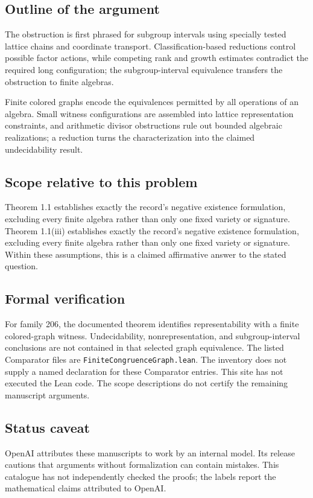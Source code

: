 \documentclass[11pt]{article}
\begin{document}
\subsection{Outline of the argument}
The obstruction is first phrased for subgroup intervals using specially tested lattice chains and coordinate transport. Classification-based reductions control possible factor actions, while competing rank and growth estimates contradict the required long configuration; the subgroup-interval equivalence transfers the obstruction to finite algebras.

Finite colored graphs encode the equivalences permitted by all operations of an algebra. Small witness configurations are assembled into lattice representation constraints, and arithmetic divisor obstructions rule out bounded algebraic realizations; a reduction turns the characterization into the claimed undecidability result.

\subsection{Scope relative to this problem}
Theorem 1.1 establishes exactly the record’s negative existence formulation, excluding every finite algebra rather than only one fixed variety or signature. Theorem 1.1(iii) establishes exactly the record’s negative existence formulation, excluding every finite algebra rather than only one fixed variety or signature. Within these assumptions, this is a claimed affirmative answer to the stated question.

\subsection{Formal verification}
For family 206, the documented theorem identifies representability with a finite colored-graph witness. Undecidability, nonrepresentation, and subgroup-interval conclusions are not contained in that selected graph equivalence. The listed Comparator files are \texttt{FiniteCongruenceGraph.lean}. The inventory does not supply a named declaration for these Comparator entries. This site has not executed the Lean code. The scope descriptions do not certify the remaining manuscript arguments.

\subsection{Status caveat}
OpenAI attributes these manuscripts to work by an internal model. Its release cautions that arguments without formalization can contain mistakes. This catalogue has not independently checked the proofs; the labels report the mathematical claims attributed to OpenAI.
\end{document}
